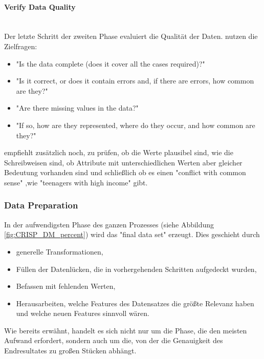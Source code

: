 \paragraph{Verify Data Quality}\mbox{} \\
Der letzte Schritt der zweiten Phase evaluiert die Qualität der Daten. \citep[S.19]{chapman_crisp-dm_2000} nutzen die Zielfragen: 
\begin{itemize}
\item "Is the data complete (does it cover all the cases required)?"
\item "Is it correct, or does it contain errors and, if there are errors, how common are they?"
\item "Are there missing values in the data?"
\item "If so, how are they represented, where do they occur, and how common
are they?"
\end{itemize}
\citep[S.~16]{shearer_crisp-dm_2000} empfiehlt zusätzlich noch, zu prüfen, ob die Werte plausibel sind, wie die Schreibweisen sind, ob Attribute mit unterschiedlichen Werten aber gleicher Bedeutung vorhanden sind und schließlich ob es einen "conflict with common sense" ,wie "teenagers with high income"\citep[S.~16]{shearer_crisp-dm_2000} gibt. 
\subsubsection{Data Preparation}\label{subsubsec:DataPreperation}
In der aufwendigsten Phase des ganzen Prozesses (siehe Abbildung \ref{fig:CRISP_DM_percent}) wird das "final data set" erzeugt. Dies geschieht durch\citep[S.~73]{swamynathan_mastering_2017}
\begin{itemize}
\item generelle Transformationen,
\item Füllen der Datenlücken, die in vorhergehenden Schritten aufgedeckt wurden,
\item Befassen mit fehlenden Werten,
\item Herausarbeiten, welche Features des Datensatzes die größte Relevanz haben und welche neuen Features sinnvoll wären.
\end{itemize}
Wie bereits erwähnt, handelt es sich nicht nur um die Phase, die den meisten Aufwand erfordert, sondern auch um die, von der die Genauigkeit des Endresultates zu großen Stücken abhängt.\citep[S.~73]{swamynathan_mastering_2017}

